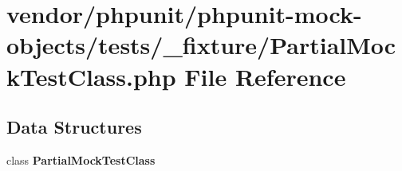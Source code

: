 \section{vendor/phpunit/phpunit-\/mock-\/objects/tests/\+\_\+fixture/\+Partial\+Mock\+Test\+Class.php File Reference}
\label{_partial_mock_test_class_8php}
\subsection*{Data Structures}
\begin{DoxyCompactItemize}
\item 
class {\bf Partial\+Mock\+Test\+Class}
\end{DoxyCompactItemize}
